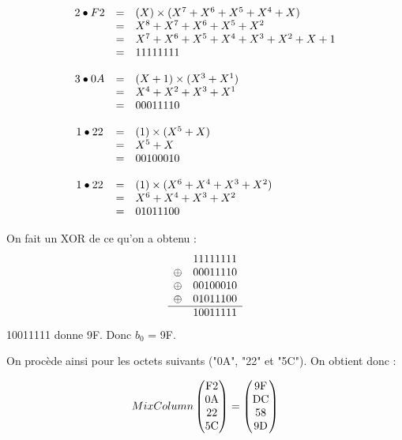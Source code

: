 $$
\begin{array}{c c l}
    2 \bullet F2 & = & (X) \times (X^7 + X^6 + X^5 + X^4 +X) \\
                & = & X^8 + X^7 + X^6 + X^5 +X^2 \\
                & = & X^7 + X^6 + X^5 +X^4 + X^3 + X^2 + X + 1 \\
                & = & 11111111 \\
    & & \\
    3 \bullet 0A & = & (X + 1) \times (X^3 + X^1) \\
                & = & X^4 + X^2 + X^3 + X^1 \\
                & = & 00011110 \\
    & & \\
    1 \bullet 22 & = & (1) \times (X^5 + X) \\
                & = & X^5 + X \\
                & = & 00100010 \\
    & & \\
    1 \bullet 22 & = & (1) \times (X^6 + X^4 +X^3 + X^2) \\
                & = & X^6 + X^4 +X^3 + X^2 \\
                & = & 01011100
\end{array}
$$

On fait un XOR de ce qu'on a obtenu :
$$
\begin{array}{c c c }
           & 11111111  \\
    \oplus & 00011110 \\
    \oplus & 00100010  \\
    \oplus & 01011100 \\
    \hline 
    & 10011111 \\
\end{array}
$$
10011111 donne 9F. Donc $b_0$ = 9F.

On procède ainsi pour les octets suivants ("0A", "22" et "5C").
On obtient donc : 

$$ MixColumn\begin{pmatrix} \text{F2} \\ \text{0A} \\ \text{22} \\ \text{5C} \\ \end{pmatrix} = 
\begin{pmatrix}
    9\text{F} \\ \text{DC} \\ 58  \\ 9\text{D}
\end{pmatrix}$$

